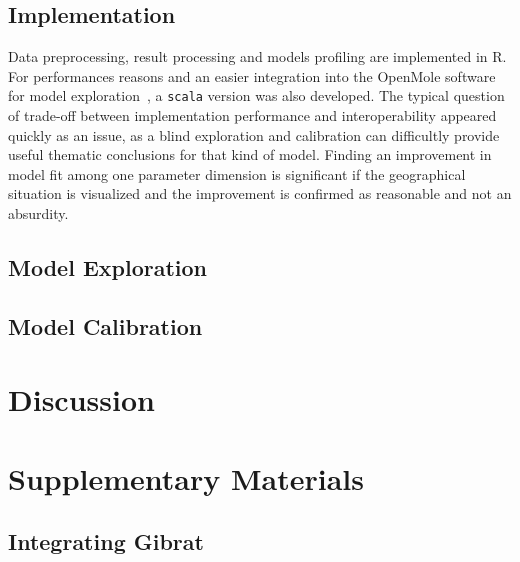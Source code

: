 \subsection{Implementation}

Data preprocessing, result processing and models profiling are implemented in R. For performances reasons and an easier integration into the OpenMole software for model exploration~\cite{reuillon2013openmole}, a \texttt{scala} version was also developed. The typical question of trade-off between implementation performance and interoperability appeared quickly as an issue, as a blind exploration and calibration can difficultly provide useful thematic conclusions for that kind of model. Finding an improvement in model fit among one parameter dimension is significant if the geographical situation is visualized and the improvement is confirmed as reasonable and not an absurdity.



\subsection{Model Exploration}



\subsection{Model Calibration}




\section{Discussion}







\section{Supplementary Materials}


\subsection{Integrating Gibrat}

